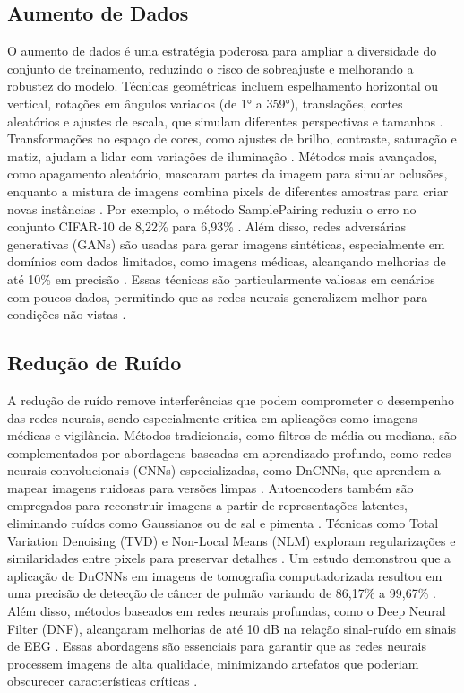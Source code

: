 \subsection{Aumento de Dados}
O aumento de dados é uma estratégia poderosa para ampliar a diversidade do conjunto de treinamento, reduzindo o risco de sobreajuste e melhorando a robustez do modelo. Técnicas geométricas incluem espelhamento horizontal ou vertical, rotações em ângulos variados (de 1° a 359°), translações, cortes aleatórios e ajustes de escala, que simulam diferentes perspectivas e tamanhos \cite{shorten2019survey}. Transformações no espaço de cores, como ajustes de brilho, contraste, saturação e matiz, ajudam a lidar com variações de iluminação \cite{shorten2019survey}. Métodos mais avançados, como apagamento aleatório, mascaram partes da imagem para simular oclusões, enquanto a mistura de imagens combina pixels de diferentes amostras para criar novas instâncias \cite{shorten2019survey}. Por exemplo, o método SamplePairing reduziu o erro no conjunto CIFAR-10 de 8,22\% para 6,93\% \cite{shorten2019survey}. Além disso, redes adversárias generativas (GANs) são usadas para gerar imagens sintéticas, especialmente em domínios com dados limitados, como imagens médicas, alcançando melhorias de até 10\% em precisão \cite{shorten2019survey}. Essas técnicas são particularmente valiosas em cenários com poucos dados, permitindo que as redes neurais generalizem melhor para condições não vistas \cite{nalepa2022data}.

\subsection{Redução de Ruído}
A redução de ruído remove interferências que podem comprometer o desempenho das redes neurais, sendo especialmente crítica em aplicações como imagens médicas e vigilância. Métodos tradicionais, como filtros de média ou mediana, são complementados por abordagens baseadas em aprendizado profundo, como redes neurais convolucionais (CNNs) especializadas, como DnCNNs, que aprendem a mapear imagens ruidosas para versões limpas \cite{sharma2024deep}. Autoencoders também são empregados para reconstruir imagens a partir de representações latentes, eliminando ruídos como Gaussianos ou de sal e pimenta \cite{sharma2024deep}. Técnicas como Total Variation Denoising (TVD) e Non-Local Means (NLM) exploram regularizações e similaridades entre pixels para preservar detalhes \cite{sharma2024deep}. Um estudo demonstrou que a aplicação de DnCNNs em imagens de tomografia computadorizada resultou em uma precisão de detecção de câncer de pulmão variando de 86,17\% a 99,67\% \cite{sharma2024deep}. Além disso, métodos baseados em redes neurais profundas, como o Deep Neural Filter (DNF), alcançaram melhorias de até 10 dB na relação sinal-ruído em sinais de EEG \cite{peer2022real}. Essas abordagens são essenciais para garantir que as redes neurais processem imagens de alta qualidade, minimizando artefatos que poderiam obscurecer características críticas \cite{sharma2024deep}.

